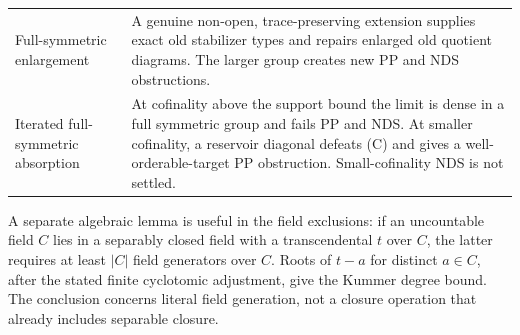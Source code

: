 \begin{longtable}{>{\raggedright\arraybackslash}p{.26\linewidth}>{\raggedright\arraybackslash}p{.66\linewidth}}
Full-symmetric enlargement & A genuine non-open, trace-preserving extension supplies exact old stabilizer types and repairs enlarged old quotient diagrams. The larger group creates new PP and NDS obstructions.\\
Iterated full-symmetric absorption & At cofinality above the support bound the limit is dense in a full symmetric group and fails PP and NDS. At smaller cofinality, a reservoir diagonal defeats (C) and gives a well-orderable-target PP obstruction. Small-cofinality NDS is not settled.\\
\bottomrule
\end{longtable}

A separate algebraic lemma is useful in the field exclusions: if an uncountable field $C$ lies in a separably closed field with a transcendental $t$ over $C$, the latter requires at least $|C|$ field generators over $C$. Roots of $t-a$ for distinct $a\in C$, after the stated finite cyclotomic adjustment, give the Kummer degree bound. The conclusion concerns literal field generation, not a closure operation that already includes separable closure.

